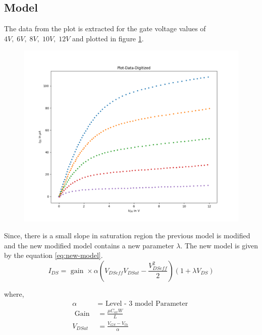 \documentclass{article}
\begin{document}
\subsection*{Model}
The data from the plot is extracted for the gate voltage values of 
\newline$4V, \; 6V, \;  8V, \; 10V, \; 12V$  and plotted in figure \ref{fig:Plot-Data-Digitized}.
\begin{figure}
    \label{fig:Plot-Data-Digitized}
    \includegraphics[scale = 0.4]{../Images/Previous/Plot-Data-Digitized.png}
\end{figure}
Since, there is a small slope in saturation region the previous model is modified and the new modified model contains a new parameter $\lambda$. 
The new model is given by the equation \ref{eq:new-model}. 
\begin{equation}
    \label{eq:new-model}
    \boxed{I_{DS} =  \text{ gain } \times \alpha (V_{DSeff}V_{DSat} - \frac{V_{DSeff}^2}{2})(1+\lambda V_{DS})  }
\end{equation}

where, 
\begin{align}
    \alpha &= \text{ Level - 3 model Parameter } \\
    \text { Gain } &= \frac{\mu C_{ox} W }{L}\\
    V_{DSat} &= \frac{V_{GS} - V_{th}}{\alpha} \\
\end{align}
\newpage
\end{document}
